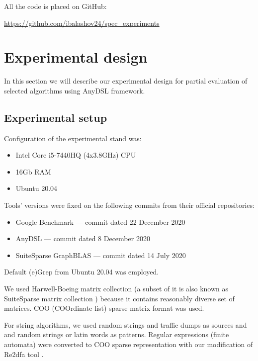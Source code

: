 \documentclass[conference]{IEEEtran}
\begin{document}
All the code is placed on GitHub:
\begin{center}
\href{https://github.com/ibalashov24/spec\_experiments}{https://github.com/ibalashov24/spec\_experiments}
\end{center}

\section{Experimental design}

In this section we will describe our experimental design for partial evaluation of selected algorithms using AnyDSL framework.

\subsection{Experimental setup}

Configuration of the experimental stand was:
\begin{itemize}
	\item Intel Core i5-7440HQ (4x3.8GHz) CPU
	\item 16Gb RAM
	\item Ubuntu 20.04
\end{itemize}

Tools' versions were fixed on the following commits from their official repositories:
\begin{itemize}
	\item Google Benchmark \cite{gbenchmark} --- commit dated 22 December 2020
	\item AnyDSL \cite{leissa2018anydsl} --- commit dated 8 December 2020
	\item SuiteSparse GraphBLAS \colorbox{red}{\cite{moreira2018implementing}} --- commit dated 14 July 2020
\end{itemize}

Default (e)Grep from Ubuntu 20.04 was employed.

We used Harwell-Boeing matrix collection \cite{duff1992users} (a subset of it is also known as SuiteSparse matrix collection \cite{davis2011university}) because it contains reasonably diverse set of matrices. COO (COOrdinate list) sparse matrix format was used.

For string algorithms, we used random strings and traffic dumps as sources and and random strings or latin words as patterns. Regular expressions (finite automata) were converted to COO sparse representation with our modification of Re2dfa tool \cite{re2dfa}.
\end{document}
